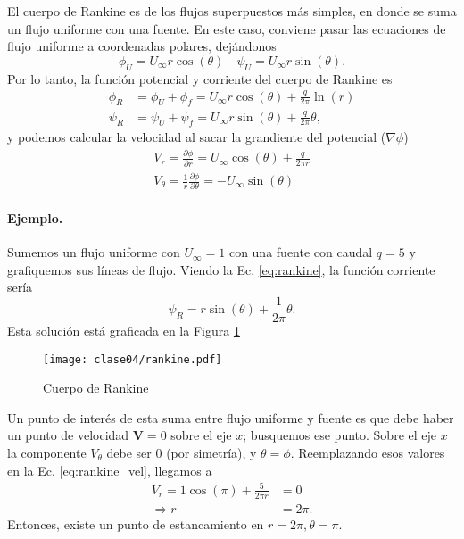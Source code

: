 El cuerpo de Rankine es de los flujos superpuestos más simples, en donde se suma un flujo uniforme con una fuente.
En este caso, conviene pasar las ecuaciones de flujo uniforme a coordenadas polares, dejándonos
%
\begin{equation}
\phi_U = U_\infty r\cos(\theta) \quad \psi_U = U_\infty r\sin(\theta).
\end{equation}
%
Por lo tanto, la función potencial y corriente del cuerpo de Rankine es
%
\begin{align}\label{eq:rankine}
\phi_R &= \phi_U+\phi_f = U_\infty r\cos(\theta) + \frac{q}{2\pi}\ln(r)\nonumber\\
\psi_R &= \psi_U+\psi_f = U_\infty r\sin(\theta) + \frac{q}{2\pi}\theta,
\end{align}
%
y podemos calcular la velocidad al sacar la grandiente del potencial ($\nabla\phi$)
%
\begin{align}\label{eq:rankine_vel}
V_r = \frac{\partial\phi}{\partial r} = U_\infty\cos(\theta) + \frac{q}{2\pi r} \nonumber\\
V_\theta = \frac{1}{r}\frac{\partial\phi}{\partial\theta} = -U_\infty\sin(\theta)
\end{align}

\paragraph{Ejemplo.}
Sumemos un flujo uniforme con $U_\infty=1$ con una fuente con caudal $q=5$ y grafiquemos sus líneas de flujo.
Viendo la Ec. \eqref{eq:rankine}, la función corriente sería
%
\begin{equation}\label{eq:rankine_ej}
\psi_R = r\sin(\theta)+\frac{1}{2\pi}\theta.
\end{equation}
%
Esta solución está graficada en la Figura \ref{fig:rankine}
%
\begin{figure}[h!]
\centering
\texttt{[image: clase04/rankine.pdf]}
\caption{Cuerpo de Rankine}
\label{fig:rankine}
\end{figure}

Un punto de interés de esta suma entre flujo uniforme y fuente es que debe haber un punto de velocidad $\mathbf{V}=0$ sobre el eje $x$; busquemos ese punto.
Sobre el eje $x$ la componente $V_\theta$ debe ser 0 (por simetría), y $\theta=\phi$.
Reemplazando esos valores en la Ec. \eqref{eq:rankine_vel}, llegamos a
%
\begin{align}
V_r = 1\cos(\pi) + \frac{5}{2\pi r} &= 0\nonumber\\
\Rightarrow r &= 2\pi.
\end{align}
%
Entonces, existe un punto de estancamiento en $r=2\pi, \theta=\pi$.

